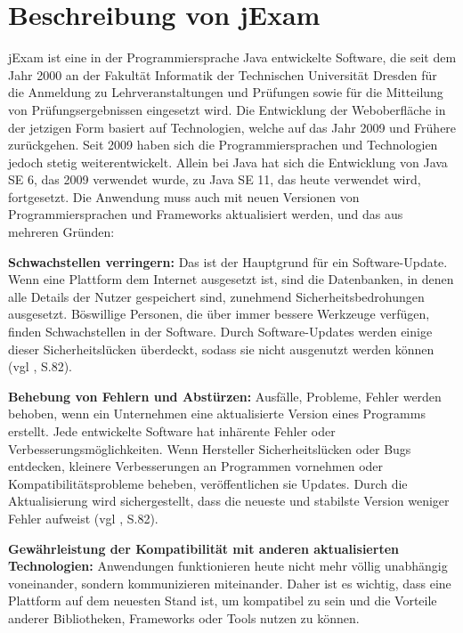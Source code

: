 \section{Beschreibung von jExam}

jExam ist eine in der Programmiersprache Java entwickelte Software,
die seit dem Jahr 2000 an der Fakult\"at Informatik der Technischen
Universit\"at Dresden für die Anmeldung zu Lehrveranstaltungen und
Pr\"ufungen sowie für die Mitteilung von Pr\"ufungsergebnissen eingesetzt
wird. Die Entwicklung der Weboberfläche in der jetzigen Form basiert
auf Technologien, welche auf das Jahr 2009 und Frühere zur\"uckgehen.
Seit 2009 haben sich die Programmiersprachen und Technologien jedoch
stetig weiterentwickelt. Allein bei Java hat sich die Entwicklung von
Java SE 6, das 2009 verwendet wurde, zu Java SE 11, das heute verwendet
wird, fortgesetzt. Die Anwendung muss auch mit neuen Versionen von
Programmiersprachen und Frameworks aktualisiert werden, und das aus
mehreren Gründen:


\textbf{Schwachstellen verringern:} Das ist der Hauptgrund für ein
Software-Update. Wenn eine Plattform dem Internet ausgesetzt ist,
sind die Datenbanken, in denen alle Details der Nutzer gespeichert
sind, zunehmend Sicherheitsbedrohungen ausgesetzt. Böswillige
Personen, die über immer bessere Werkzeuge verfügen, finden
Schwachstellen in der Software.  Durch Software-Updates werden einige
dieser Sicherheitslücken überdeckt, sodass sie nicht ausgenutzt werden
können (vgl \cite{10.1145/605466.605479}, S.82).

\textbf{Behebung von Fehlern und Abstürzen:} Ausfälle, Probleme, Fehler
werden behoben, wenn ein Unternehmen eine aktualisierte Version eines
Programms erstellt. Jede entwickelte Software hat inhärente Fehler
oder Verbesserungsmöglichkeiten. Wenn Hersteller Sicherheitslücken
oder Bugs entdecken, kleinere Verbesserungen an Programmen vornehmen
oder Kompatibilitätsprobleme beheben, veröffentlichen sie Updates.
Durch die Aktualisierung wird sichergestellt, dass die neueste und
stabilste Version weniger Fehler aufweist (vgl \cite{10.1145/605466.605479}, S.82).

\textbf{Gewährleistung der Kompatibilität mit anderen aktualisierten
Technologien:} Anwendungen funktionieren heute nicht mehr völlig unabhängig
voneinander, sondern kommunizieren miteinander. Daher ist es wichtig, dass eine
Plattform auf dem neuesten Stand ist, um kompatibel zu sein und die
Vorteile anderer Bibliotheken, Frameworks oder Tools nutzen zu können.


